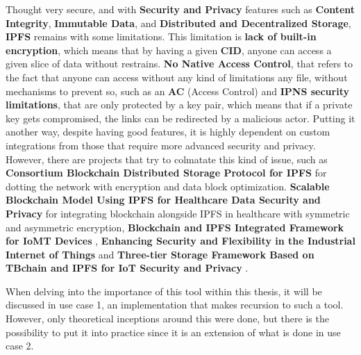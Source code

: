 Thought very secure, and with \textbf{Security and Privacy} features such as \textbf{Content Integrity}, \textbf{Immutable Data}, and \textbf{Distributed and Decentralized Storage}, \textbf{IPFS} remains with some limitations. This limitation is \textbf{lack of built-in encryption}, which means that by having a given \textbf{CID}, anyone can access a given slice of data without restrains. \textbf{No Native Access Control}, that refers to the fact that anyone can access without any kind of limitations any file, without mechanisms to prevent so, such as an \textbf{AC} (Access Control) and \textbf{IPNS security limitations}, that are only protected by a key pair, which means that if a private key gets compromised, the links can be redirected by a malicious actor. Putting it another way, despite having good features, it is highly dependent on custom integrations from those that require more advanced security and privacy. However, there are projects that try to colmatate this kind of issue, such as \textbf{Consortium Blockchain Distributed Storage Protocol for IPFS} \cite{ipfs-consortium-blockchain-distributed-storage-protocol} for dotting the network with encryption and data block optimization. \textbf{Scalable Blockchain Model Using IPFS for Healthcare Data Security and Privacy} \cite{ipfs-scalable-blockchain-model-using-ipfs} for integrating blockchain alongside IPFS in healthcare with symmetric and asymmetric encryption, \textbf{Blockchain and IPFS Integrated Framework for IoMT Devices} \cite{ipfs-blockchain-integrated-framework}, \textbf{Enhancing Security and Flexibility in the Industrial Internet of Things} \cite{ipfs-ehnancing-security-and-flexibility-in-industrial} and \textbf{Three-tier Storage Framework Based on TBchain and IPFS for IoT Security and Privacy} \cite{ipfs-three-tier-storage}.

When delving into the importance of this tool within this thesis, it will be discussed in use case 1, an implementation that makes recursion to such a tool. However, only theoretical inceptions around this were done, but there is the possibility to put it into practice since it is an extension of what is done in use case 2.

